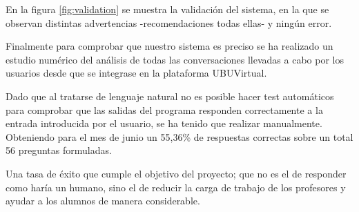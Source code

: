 En la figura \ref{fig:validation} se muestra la validación del sistema, en la que se observan distintas advertencias -recomendaciones todas ellas- y ningún error.

Finalmente para comprobar que nuestro sistema es preciso se ha realizado un estudio numérico del análisis de todas las conversaciones llevadas a cabo por los usuarios desde que se integrase en la plataforma UBUVirtual.  

Dado que al tratarse de lenguaje natural no es posible hacer test automáticos para comprobar que las salidas del programa responden correctamente a la entrada introducida por el usuario, se ha tenido que realizar manualmente. Obteniendo para el mes de junio un 55,36\% de respuestas correctas sobre un total 56 preguntas formuladas.

Una tasa de éxito que cumple el objetivo del proyecto; que no es el de responder como haría un humano, sino el de reducir la carga de trabajo de los profesores y ayudar a los alumnos de manera considerable.